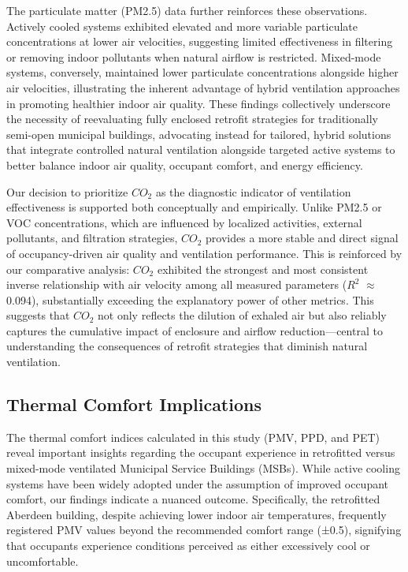 \documentclass[preprint,12pt]{elsarticle}
\begin{document}
The particulate matter (PM2.5) data further reinforces these observations. Actively cooled systems exhibited elevated and more variable particulate concentrations at lower air velocities, suggesting limited effectiveness in filtering or removing indoor pollutants when natural airflow is restricted. Mixed-mode systems, conversely, maintained lower particulate concentrations alongside higher air velocities, illustrating the inherent advantage of hybrid ventilation approaches in promoting healthier indoor air quality. These findings collectively underscore the necessity of reevaluating fully enclosed retrofit strategies for traditionally semi-open municipal buildings, advocating instead for tailored, hybrid solutions that integrate controlled natural ventilation alongside targeted active systems to better balance indoor air quality, occupant comfort, and energy efficiency.

Our decision to prioritize $CO_2$ as the diagnostic indicator of ventilation effectiveness is supported both conceptually and empirically. Unlike PM2.5 or VOC concentrations, which are influenced by localized activities, external pollutants, and filtration strategies, $CO_2$ provides a more stable and direct signal of occupancy-driven air quality and ventilation performance. This is reinforced by our comparative analysis: $CO_2$ exhibited the strongest and most consistent inverse relationship with air velocity among all measured parameters ($R^2$ $\approx$ 0.094), substantially exceeding the explanatory power of other metrics. This suggests that $CO_2$ not only reflects the dilution of exhaled air but also reliably captures the cumulative impact of enclosure and airflow reduction—central to understanding the consequences of retrofit strategies that diminish natural ventilation.
\subsection{Thermal Comfort Implications}
The thermal comfort indices calculated in this study (PMV, PPD, and PET) reveal important insights regarding the occupant experience in retrofitted versus mixed-mode ventilated Municipal Service Buildings (MSBs). While active cooling systems have been widely adopted under the assumption of improved occupant comfort, our findings indicate a nuanced outcome. Specifically, the retrofitted Aberdeen building, despite achieving lower indoor air temperatures, frequently registered PMV values beyond the recommended comfort range (±0.5), signifying that occupants experience conditions perceived as either excessively cool or uncomfortable.
\end{document}
